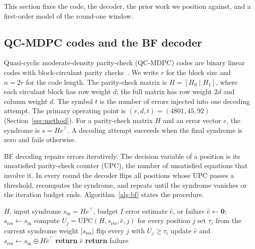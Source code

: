 \documentclass[letterpaper,journal]{IEEEtran}
\begin{document}
This section fixes the code, the decoder, the prior work we position against, and a first-order model of the round-one window.

\subsection{QC-MDPC codes and the BF decoder}

Quasi-cyclic moderate-density parity-check (QC-MDPC) codes are binary linear codes with block-circulant parity checks~\cite{misoczki2013mdpc}. We write $r$ for the block size and $n=2r$ for the code length. The parity-check matrix is $H=[H_0\mid H_1]$, where each circulant block has row weight $d$; the full matrix has row weight $2d$ and column weight $d$. The symbol $t$ is the number of errors injected into one decoding attempt. The primary operating point is $(r,d,t)=(4801,45,92)$ (Section~\ref{sec:method}). For a parity-check matrix $H$ and an error vector $e$, the syndrome is $s=He^{\top}$. A decoding attempt succeeds when the final syndrome is zero and fails otherwise.

BF decoding repairs errors iteratively. The decision variable of a position is its unsatisfied parity-check counter (UPC), the number of unsatisfied equations that involve it. In every round the decoder flips all positions whose UPC passes a threshold, recomputes the syndrome, and repeats until the syndrome vanishes or the iteration budget ends. Algorithm~\ref{alg:bf} states the procedure.

\begin{algorithm}[t]
\caption{Plain BF decoding}
\label{alg:bf}
\begin{algorithmic}[1]
\Require $H$, input syndrome $s_{\mathrm{in}}=He^{\top}$, budget $I$
\Ensure error estimate $\hat e$, or failure
\State $\hat e \gets \mathbf{0}$; $s_{\mathrm{res}} \gets s_{\mathrm{in}}$
  \State compute $U_j=\mathrm{UPC}(H,s_{\mathrm{res}},\hat e,j)$ for every position $j$
  \State set $\tau_i$ from the current syndrome weight $|s_{\mathrm{res}}|$
  \State flip every $j$ with $U_j\ge\tau_i$
  \State update $\hat e$ and $s_{\mathrm{res}}\gets s_{\mathrm{in}}\oplus H\hat e^{\top}$
    \State \textbf{return} $\hat e$
  \EndIf
\EndFor
\State \textbf{return} failure
\end{algorithmic}
\end{algorithm}
\end{document}
